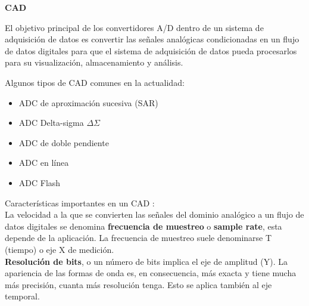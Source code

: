 \begin{center}
	\LARGE\bfseries CAD
\end{center}

El objetivo principal de los convertidores A/D dentro de un sistema de adquisición de datos es convertir las señales analógicas condicionadas en un flujo de datos digitales para que el sistema de adquisición de datos pueda procesarlos para su visualización, almacenamiento y análisis.

Algunos tipos de CAD comunes en la actualidad:

\begin{itemize}
	\item ADC de aproximación sucesiva (SAR)
	\item	ADC Delta-sigma  $\Delta\Sigma$
	\item ADC de doble pendiente
	\item ADC en línea
	\item ADC Flash
\end{itemize}

Características importantes en un CAD : \\

La velocidad a la que se convierten las señales del dominio analógico a un flujo de datos digitales se denomina \textbf{frecuencia de muestreo} o \textbf{sample rate}, esta depende de la aplicación. La frecuencia de muestreo suele denominarse T (tiempo) o eje X de medición.\\

\textbf{Resolución de bits}, o un número de bits implica el eje de amplitud (Y). La apariencia de las formas de onda es, en consecuencia, más exacta y tiene mucha más precisión, cuanta más resolución tenga. Esto se aplica también al eje temporal.

 \begin{figure}[!htbp]
\end{figure}






